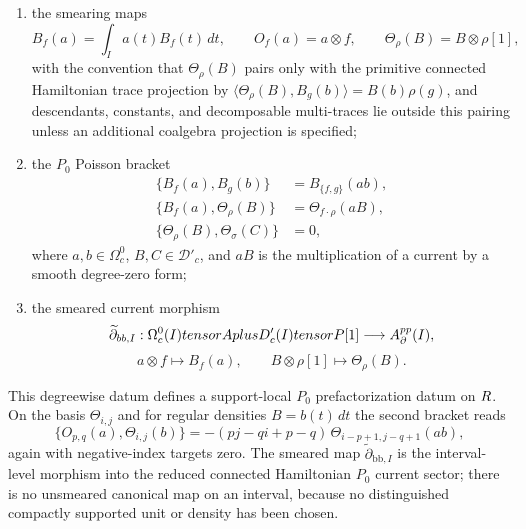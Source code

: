 \documentclass[11pt]{memoir}
\begin{document}
\begin{thm}
\begin{enumerate}
		      $I\mapsto\mathcal D'_c(I)$ given by extension by zero;
    \item the smearing maps
      $$B_f(a)=\int_I a(t)B_f(t)\,dt,\qquad
        O_f(a)=a\otimes f,\qquad
        \Theta_\rho(B)=B\otimes\rho[1],$$
      with the convention that $\Theta_\rho(B)$ pairs only with the
      primitive connected Hamiltonian trace projection by
      $\langle\Theta_\rho(B),B_g(b)\rangle=B(b)\rho(g)$, and
      descendants, constants, and decomposable multi-traces lie outside
      this pairing unless an additional coalgebra projection is
      specified;
    \item the $P_0$ Poisson bracket
      \begin{align*}
        \{B_f(a),B_g(b)\}&=B_{\{f,g\}}(ab),\\
        \{B_f(a),\Theta_\rho(B)\}&=\Theta_{f\cdot\rho}(aB),\\
        \{\Theta_\rho(B),\Theta_\sigma(C)\}&=0,
      \end{align*}
	      where $a,b\in\Omega^0_c$, $B,C\in\mathcal D'_c$, and $aB$ is the
	      multiplication of a current by a smooth degree-zero form;
	    \item the smeared current morphism
	      \[
	        \widetilde\partial_{bb,I}:
	        \Omega_c^0(I)tensorA
	        plus D'_c(I)tensorP[1]
	        \longrightarrow A_{\partial}^{pp}(I),
	      \]
	      \[
	        a\otimes f\longmapsto B_f(a),\qquad
	        B\otimes\rho[1]\longmapsto\Theta_\rho(B).
	      \]
	  \end{enumerate}
	  This degreewise datum defines a support-local \(P_0\) prefactorization datum on
	  $R$. On the basis
  $\Theta_{i,j}$ and for regular densities $B=b(t)\,dt$ the second
  bracket reads
  $$\{O_{p,q}(a),\Theta_{i,j}(b)\}
    =-(pj-qi+p-q)\,\Theta_{i-p+1,j-q+1}(ab),$$
	  again with negative-index targets zero. The smeared map
	  \(\widetilde\partial_{\mathrm{bb},I}\) is the interval-level morphism into
	  the reduced connected Hamiltonian \(P_0\) current sector; there is no
	  unsmeared canonical map on an interval, because no distinguished compactly
	  supported unit or density has been chosen.
\end{thm}
\end{document}
